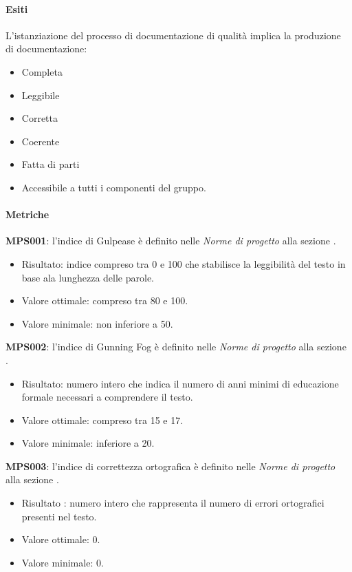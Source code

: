 \documentclass[../piano-di-qualifica.tex]{subfiles}
\begin{document}
\paragraph{Esiti}
\label{par:esiti}
L'istanziazione del processo di documentazione di qualità implica la produzione di documentazione:
\begin{itemize}
	\item Completa
	\item Leggibile
	\item Corretta
	\item Coerente
	\item Fatta di parti
	\item Accessibile a tutti i componenti del gruppo.
\end{itemize}

\paragraph{Metriche}
\label{par:metriche}

\textbf{MPS001}: l'indice di Gulpease è definito nelle \textit{Norme di progetto} alla sezione 	.
\begin{itemize}
	\item Risultato: indice compreso tra 0 e 100 che stabilisce la leggibilità del testo in base ala lunghezza delle parole.
	\item Valore ottimale: compreso tra 80 e 100.
	\item Valore minimale: non inferiore a 50.
\end{itemize}

\textbf{MPS002}: l'indice di Gunning Fog è definito nelle \textit{Norme di progetto} alla sezione .
\begin{itemize}
	\item Risultato: numero intero che indica il numero di anni minimi di educazione formale necessari a comprendere il testo.
	\item Valore ottimale: compreso tra 15 e 17.
	\item Valore minimale: inferiore a 20.
\end{itemize}

\textbf{MPS003}: l'indice di correttezza ortografica è definito nelle \textit{Norme di progetto} alla sezione .
\begin{itemize}
	\item Risultato : numero intero che rappresenta il numero di errori ortografici presenti nel testo.
	\item Valore ottimale: 0.
	\item Valore minimale: 0.
\end{itemize}
\end{document}
